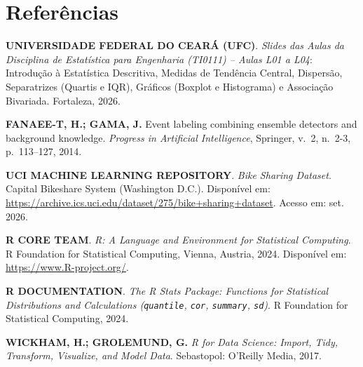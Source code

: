 \documentclass[10pt, a4paper]{article}
\begin{document}
\clearpage
\section*{Referências}

\begin{enumerate}[label={[\arabic*]}, leftmargin=*, itemsep=8pt]
    \item \textbf{UNIVERSIDADE FEDERAL DO CEARÁ (UFC)}. \textit{Slides das Aulas da Disciplina de Estatística para Engenharia (TI0111) -- Aulas L01 a L04}: Introdução à Estatística Descritiva, Medidas de Tendência Central, Dispersão, Separatrizes (Quartis e IQR), Gráficos (Boxplot e Histograma) e Associação Bivariada. Fortaleza, 2026.
    
    \item \textbf{FANAEE-T, H.; GAMA, J.} Event labeling combining ensemble detectors and background knowledge. \textit{Progress in Artificial Intelligence}, Springer, v.~2, n.~2-3, p.~113--127, 2014.
    
    \item \textbf{UCI MACHINE LEARNING REPOSITORY}. \textit{Bike Sharing Dataset}. Capital Bikeshare System (Washington D.C.). Disponível em: \url{https://archive.ics.uci.edu/dataset/275/bike+sharing+dataset}. Acesso em: set. 2026.
    
    \item \textbf{R CORE TEAM}. \textit{R: A Language and Environment for Statistical Computing}. R Foundation for Statistical Computing, Vienna, Austria, 2024. Disponível em: \url{https://www.R-project.org/}.
    
    \item \textbf{R DOCUMENTATION}. \textit{The R Stats Package: Functions for Statistical Distributions and Calculations (\texttt{quantile}, \texttt{cor}, \texttt{summary}, \texttt{sd})}. R Foundation for Statistical Computing, 2024.
    
    \item \textbf{WICKHAM, H.; GROLEMUND, G.} \textit{R for Data Science: Import, Tidy, Transform, Visualize, and Model Data}. Sebastopol: O'Reilly Media, 2017.
\end{enumerate}
\end{document}
